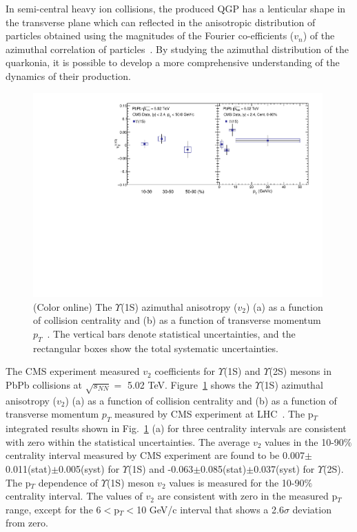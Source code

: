In semi-central heavy ion collisions,
the produced QGP has a lenticular shape in the transverse plane
which can reflected in the anisotropic
distribution of particles obtained using the magnitudes
of the Fourier co-efficients ($v_{n}$) of the azimuthal correlation of
particles~\cite{Voloshin:1994mz}. By studying the azimuthal distribution of
the quarkonia, it is possible to develop a more comprehensive understanding
of the dynamics of their production.

\begin{figure}
\includegraphics[width=0.99\textwidth]{Figures/ExpOverview/Fig_CMS_Y1S_5TeV_V2.pdf}
\caption{(Color online) The $\Upsilon$(1S) azimuthal anisotropy ($v_{2}$) (a) as a
  function of collision centrality and (b) as a function of transverse momentum
  $p_{T}$~\cite{CMS:2020efs}. The vertical bars denote statistical uncertainties,
  and the rectangular boxes show the total systematic uncertainties.
}
\label{fig:Upsilon1SV2CMS}
\end{figure}



The CMS experiment measured $v_{2}$ coefficients for $\Upsilon$(1S) and $\Upsilon$(2S)
mesons in PbPb collisions at $\sqrt{s_{NN}}=$ 5.02 TeV.
Figure~\ref{fig:Upsilon1SV2CMS} shows the $\Upsilon$(1S) azimuthal
anisotropy ($v_{2}$) (a) as a function of collision centrality and (b) as a
function of transverse momentum $p_{T}$ measured by CMS experiment at
LHC~\cite{CMS:2020efs}. The p$_{T}$ integrated results shown in
Fig.~\ref{fig:Upsilon1SV2CMS} (a) for three centrality intervals are consistent
with zero within the statistical uncertainties. The average $v_{2}$ values in the
10-90$\%$ centrality interval measured by CMS experiment are found to
be 0.007$\pm$0.011(stat)$\pm$0.005(syst) for $\Upsilon$(1S) and
-0.063$\pm$0.085(stat)$\pm$0.037(syst) for $\Upsilon$(2S).   
The p$_{T}$ dependence of $\Upsilon$(1S) meson $v_{2}$ values is measured
for the 10-90$\%$ centrality interval. The values of $v_{2}$ are consistent with
zero in the measured p$_T$ range, except for the 6$<$p$_{T}<$10 GeV/c interval that
shows a 2.6$\sigma$ deviation from zero. 

